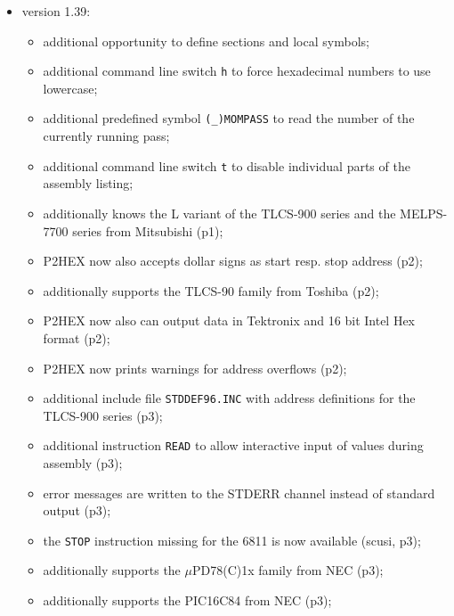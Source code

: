 \documentclass[12pt,twoside]{report}
\newcommand{\tty}[1]{{\tt #1}}
\newcommand{\predefsym}[1]{{\tt (\_)#1}}
\begin{document}
\begin{itemize}
{\begin{itemize}
{            dollar signs (p2);}
      \item{the 8048 code generator now also knows the 8041/42
            instruction extensions (p2);}
      \item{additionally supports the Z8 microcontrollers (p3).}
      \end{itemize}}
\item{version 1.39:
      \begin{itemize}
      \item{additional opportunity to define sections and local
            symbols;}
      \item{additional command line switch \tty{h} to force hexadecimal
            numbers to use lowercase;}
      \item{additional predefined symbol \predefsym{MOMPASS} to read the
            number of the currently running pass;}
      \item{additional command line switch \tty{t} to disable
            individual parts of the assembly listing;}
      \item{additionally knows the L variant of the TLCS-900
            series and the MELPS-7700 series from Mitsubishi
            (p1);}
      \item{P2HEX now also accepts dollar signs as start resp.
            stop address (p2);}
      \item{additionally supports the TLCS-90 family from
            Toshiba (p2);}
      \item{P2HEX now also can output data in Tektronix and
            16 bit Intel Hex format (p2);}
      \item{P2HEX now prints warnings for address overflows
            (p2);}
      \item{additional include file \tty{STDDEF96.INC} with address
            definitions for the TLCS-900 series (p3);}
      \item{additional instruction \tty{READ} to allow interactive
            input of values during assembly (p3);}
      \item{error messages are written to the STDERR channel
            instead of standard output (p3);}
      \item{the \tty{STOP} instruction missing for the 6811 is now
            available (scusi, p3);}
      \item{additionally supports the $\mu$PD78(C)1x family from
            NEC (p3);}
      \item{additionally supports the PIC16C84 from NEC (p3);}

\end{itemize}}
\end{itemize}
\end{document}
